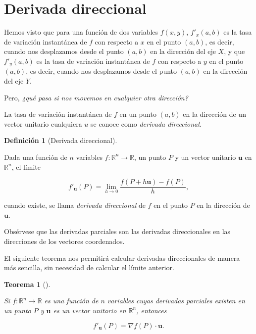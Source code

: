 \documentclass[
  a4paper,
]{scrreport}
\theoremstyle{definition}
\newtheorem{definition}{Definición}[chapter]
\theoremstyle{plain}
\newtheorem{theorem}{Teorema}[chapter]
\theoremstyle{plain}
\theoremstyle{definition}
\theoremstyle{definition}
\theoremstyle{plain}
\theoremstyle{remark}
\begin{document}
\hypertarget{derivada-direccional}{%
\section{Derivada direccional}\label{derivada-direccional}}

Hemos visto que para una función de dos variables \(f(x,y)\),
\(f'_x(a,b)\) es la tasa de variación instantánea de \(f\) con respecto
a \(x\) en el punto \((a,b)\), es decir, cuando nos desplazamos desde el
punto \((a,b)\) en la dirección del eje \(X\), y que \(f'_y(a,b)\) es la
tasa de variación instantánea de \(f\) con respecto a \(y\) en el punto
\((a,b)\), es decir, cuando nos desplazamos desde el punto \((a,b)\) en
la dirección del eje \(Y\).

Pero, \emph{¿qué pasa si nos movemos en cualquier otra dirección?}

La tasa de variación instantánea de \(f\) en un punto \((a,b)\) en la
dirección de un vector unitario cualquiera \(u\) se conoce como
\emph{derivada direccional}.

\begin{definition}[Derivada
direccional]\protect\hypertarget{def-derivada-direccional}{}\label{def-derivada-direccional}

Dada una función de \(n\) variables
\(f:\mathbb{R}^n\rightarrow \mathbb{R}\), un punto \(P\) y un vector
unitario \(\mathbf{u}\) en \(\mathbb{R}^n\), el límite

\[
f'_{\mathbf{u}}(P) = \lim_{h\rightarrow 0}\frac{f(P+h\mathbf{u})-f(P)}{h},
\]

cuando existe, se llama \emph{derivada direccional} de \(f\) en el punto
\(P\) en la dirección de \(\mathbf{u}\).

\end{definition}

Obsérvese que las derivadas parciales son las derivadas direccionales en
las direcciones de los vectores coordenados.

El siguiente teorema nos permitirá calcular derivadas direccionales de
manera más sencilla, sin necesidad de calcular el límite anterior.

\begin{theorem}[]\protect\hypertarget{thm-derivada-direccional}{}\label{thm-derivada-direccional}

Si \(f:\mathbb{R}^n\rightarrow \mathbb{R}\) es una función de \(n\)
variables cuyas derivadas parciales existen en un punto \(P\) y
\(\mathbf{u}\) es un vector unitario en \(\mathbb{R}^n\), entonces

\[
f'_{\mathbf{u}}(P) = \nabla f(P)\cdot \mathbf{u}.
\]

\end{theorem}
\end{document}
